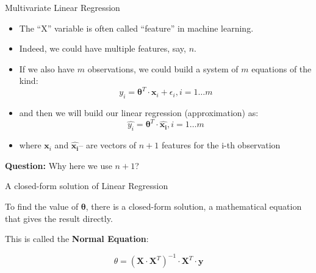 \documentclass{beamer}
\begin{document}
\begin{frame}
{\centerline{Multivariate Linear Regression }}

\begin{itemize}
\item The ``X'' variable is often called ``feature'' in machine learning.
\item Indeed, we could have multiple features, say, $n$.
\item If we also have $m$ observations, we could build a system of $m$ equations of the kind:
$$ y_i = \boldsymbol \theta^T \cdot \boldsymbol x_i + \epsilon_i, i=1\ldots m$$
\item and then we will build our linear regression (approximation) as:
$$ \hat{y_i} = \boldsymbol \theta^T \cdot \boldsymbol{\hat{x_i}}, i=1\ldots m$$

\item where $\boldsymbol x_i$ and  $\boldsymbol{\hat{x_i}}$-- are vectors of $n+1$ features for the i-th observation
\end{itemize}

\textbf{Question:} Why here we use $n+1$?
\end{frame}

\begin{frame}
{\centerline{A closed-form solution of Linear Regression }}

To find the value of $\boldsymbol \theta$, there is a closed-form solution, a mathematical equation that gives the result directly.  

This is called the \textbf{Normal Equation}:

$$\theta = (\boldsymbol X \cdot \boldsymbol X^T)^{-1} \cdot \boldsymbol X^T \cdot \boldsymbol y$$


\end{frame}
\end{document}
